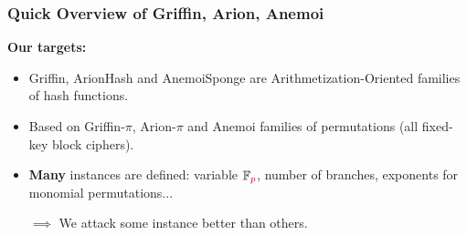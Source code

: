 \documentclass[aspectratio=169]{beamer}
\newcommand\p{{\textcolor{purple}{p}}}
\begin{document}



\begin{frame}
  \frametitle{Quick Overview of Griffin, Arion, Anemoi}

  \textbf{Our targets:}

    \begin{center}
  \end{center}

  \begin{itemize}
  \item Griffin, ArionHash and AnemoiSponge are Arithmetization-Oriented families of hash functions.
  \item Based on Griffin-$\pi$, Arion-$\pi$ and Anemoi families of permutations (all fixed-key block ciphers).

    \pause
  \item \textbf{Many} instances are defined: variable $\mathbb{F}_\p$, number of branches, exponents for monomial permutations...

    \begin{center}
      \textcolor{myred}{$\implies$ We attack some instance better than others.}
    \end{center}

  \end{itemize}
\end{frame}
\end{document}
